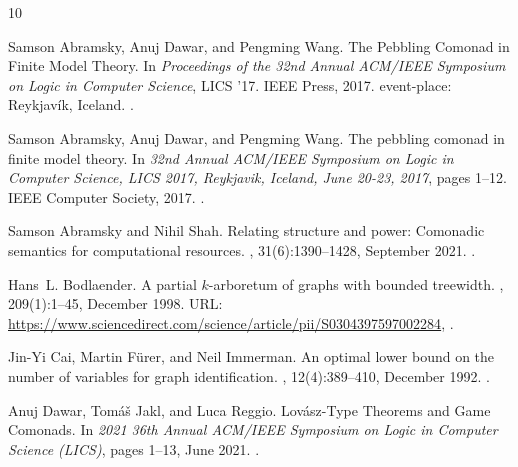 \documentclass[a4paper,UKenglish,cleveref, autoref, thm-restate]{lipics-v2021}
\begin{document}
\begin{thebibliography}{10}

Samson Abramsky, Anuj Dawar, and Pengming Wang.
\newblock The {Pebbling} {Comonad} in {Finite} {Model} {Theory}.
\newblock In {\em Proceedings of the 32nd {Annual} {ACM}/{IEEE} {Symposium} on
  {Logic} in {Computer} {Science}}, {LICS} '17. IEEE Press, 2017.
\newblock event-place: Reykjavík, Iceland.
\newblock \href {https://doi.org/10.1109/LICS.2017.8005129}
  {}.

Samson Abramsky, Anuj Dawar, and Pengming Wang.
\newblock The pebbling comonad in finite model theory.
\newblock In {\em 32nd Annual {ACM/IEEE} Symposium on Logic in Computer
  Science, {LICS} 2017, Reykjavik, Iceland, June 20-23, 2017}, pages 1--12.
  {IEEE} Computer Society, 2017.
\newblock \href {https://doi.org/10.1109/LICS.2017.8005129}
  {}.

Samson Abramsky and Nihil Shah.
\newblock Relating structure and power: {Comonadic} semantics for computational
  resources.
, 31(6):1390--1428, September
  2021.
\newblock \href {https://doi.org/10.1093/logcom/exab048}
  {}.

Hans~L. Bodlaender.
\newblock A partial $k$-arboretum of graphs with bounded treewidth.
, 209(1):1--45, December 1998.
\newblock URL:
  \url{https://www.sciencedirect.com/science/article/pii/S0304397597002284},
  \href {https://doi.org/10.1016/S0304-3975(97)00228-4}
  {}.

Jin-Yi Cai, Martin Fürer, and Neil Immerman.
\newblock An optimal lower bound on the number of variables for graph
  identification.
, 12(4):389--410, December 1992.
\newblock \href {https://doi.org/10.1007/BF01305232}
  {}.

Anuj Dawar, Tomá\v{s} Jakl, and Luca Reggio.
\newblock Lovász-{Type} {Theorems} and {Game} {Comonads}.
\newblock In {\em 2021 36th {Annual} {ACM}/{IEEE} {Symposium} on {Logic} in
  {Computer} {Science} ({LICS})}, pages 1--13, June 2021.
\newblock \href {https://doi.org/10.1109/LICS52264.2021.9470609}
  {}.


\end{thebibliography}
\end{document}
